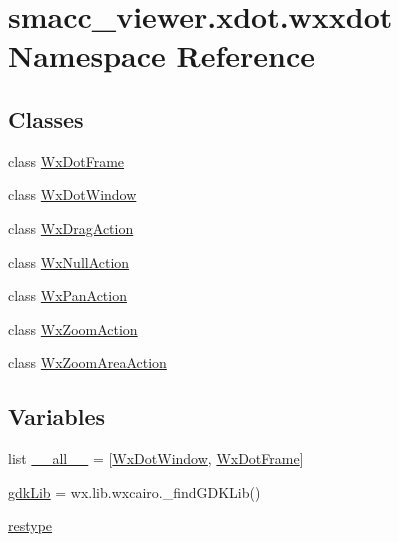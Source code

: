 \hypertarget{namespacesmacc__viewer_1_1xdot_1_1wxxdot}{}\section{smacc\+\_\+viewer.\+xdot.\+wxxdot Namespace Reference}
\label{namespacesmacc__viewer_1_1xdot_1_1wxxdot}
\subsection*{Classes}
\begin{DoxyCompactItemize}
\item 
class \hyperlink{classsmacc__viewer_1_1xdot_1_1wxxdot_1_1WxDotFrame}{Wx\+Dot\+Frame}
\item 
class \hyperlink{classsmacc__viewer_1_1xdot_1_1wxxdot_1_1WxDotWindow}{Wx\+Dot\+Window}
\item 
class \hyperlink{classsmacc__viewer_1_1xdot_1_1wxxdot_1_1WxDragAction}{Wx\+Drag\+Action}
\item 
class \hyperlink{classsmacc__viewer_1_1xdot_1_1wxxdot_1_1WxNullAction}{Wx\+Null\+Action}
\item 
class \hyperlink{classsmacc__viewer_1_1xdot_1_1wxxdot_1_1WxPanAction}{Wx\+Pan\+Action}
\item 
class \hyperlink{classsmacc__viewer_1_1xdot_1_1wxxdot_1_1WxZoomAction}{Wx\+Zoom\+Action}
\item 
class \hyperlink{classsmacc__viewer_1_1xdot_1_1wxxdot_1_1WxZoomAreaAction}{Wx\+Zoom\+Area\+Action}
\end{DoxyCompactItemize}
\subsection*{Variables}
\begin{DoxyCompactItemize}
\item 
list \hyperlink{namespacesmacc__viewer_1_1xdot_1_1wxxdot_a5470eaae084906d34ddd06ca7d44838e}{\+\_\+\+\_\+all\+\_\+\+\_\+} = \mbox{[}\textquotesingle{}\hyperlink{classsmacc__viewer_1_1xdot_1_1wxxdot_1_1WxDotWindow}{Wx\+Dot\+Window}\textquotesingle{}, \textquotesingle{}\hyperlink{classsmacc__viewer_1_1xdot_1_1wxxdot_1_1WxDotFrame}{Wx\+Dot\+Frame}\textquotesingle{}\mbox{]}
\item 
\hyperlink{namespacesmacc__viewer_1_1xdot_1_1wxxdot_a9e4cf3660e919da4b1430fbea1065d03}{gdk\+Lib} = wx.\+lib.\+wxcairo.\+\_\+find\+G\+D\+K\+Lib()
\item 
\hyperlink{namespacesmacc__viewer_1_1xdot_1_1wxxdot_aad3e2be0350fd8f6d4430c598cde1838}{restype}
\end{DoxyCompactItemize}


